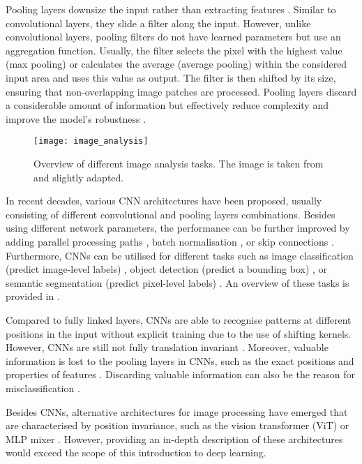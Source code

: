 Pooling layers downsize the input rather than extracting features .
Similar to convolutional layers, they slide a filter along the input.
However, unlike convolutional layers, pooling filters do not have learned parameters but use an aggregation function.
Usually, the filter selects the pixel with the highest value (max pooling) or calculates the average (average pooling) within the considered input area and uses this value as output.
The filter is then shifted by its size, ensuring that non-overlapping image patches are processed.
Pooling layers discard a considerable amount of information but effectively reduce complexity and improve the model's robustness \cite{ciresan_flexible_2011}.

\begin{figure}[h]
    \centering
    \texttt{[image: image\_analysis]}
    \caption[Overview of different image analysis tasks]{Overview of different image analysis tasks. The image is taken from  and slightly adapted.}
\end{figure}
In recent decades, various CNN architectures have been proposed, usually consisting of different convolutional and pooling layers combinations. Besides using different network parameters, the performance can be further improved by adding parallel processing paths , batch normalisation , or skip connections . Furthermore, CNNs can be utilised for different tasks such as image classification (predict image-level labels) \cite{schmarje_survey_2021}, object detection (predict a bounding box) \cite{zou_object_2023}, or semantic segmentation (predict pixel-level labels) \cite{asgari_taghanaki_deep_2021}. An overview of these tasks is provided in .

Compared to fully linked layers, CNNs are able to recognise patterns at different positions in the input without explicit training due to the use of shifting kernels. However, CNNs are still not fully translation invariant . Moreover, valuable information is lost to the pooling layers in CNNs, such as the exact positions and properties of features . Discarding valuable information can also be the reason for misclassification .

Besides CNNs, alternative architectures for image processing have emerged that are characterised by position invariance, such as the vision transformer (ViT) \cite{dosovitskiy_image_2021} or MLP mixer \cite{tolstikhin_mlp-mixer_2021}. However, providing an in-depth description of these architectures would exceed the scope of this introduction to deep learning.

